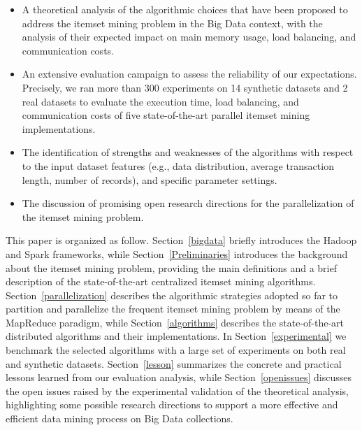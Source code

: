 \documentclass[preprint,review,12pt]{elsarticle}
\begin{document}
\begin{itemize}
\item A theoretical analysis of the algorithmic choices that have been proposed to address the itemset mining problem 
in the Big Data context, with the analysis of their expected impact on main memory usage, load balancing, and communication costs. 

\item An extensive evaluation campaign to assess the reliability of our expectations.
Precisely, we ran more than 300 experiments on 14 synthetic datasets and 2 real datasets to evaluate the execution time, load balancing, and communication costs
of five state-of-the-art parallel itemset mining implementations. 

\item The identification of strengths and weaknesses of the algorithms 
with respect to 
the input dataset features (e.g., data distribution, average  transaction length, number of records), 
and specific parameter settings. 

\item The discussion of promising open research directions for the parallelization of the itemset mining problem.

\end{itemize}

This paper is organized as follow. Section~\ref{bigdata} briefly introduces the
Hadoop and Spark frameworks,  while Section~\ref{Preliminaries} introduces the
background about the itemset mining problem, providing the main definitions and a brief description of the state-of-the-art centralized itemset mining algorithms. 
Section~\ref{parallelization} describes the algorithmic strategies adopted so far to partition and parallelize the frequent itemset mining problem by means of the MapReduce paradigm, while 
Section~\ref{algorithms} describes the state-of-the-art distributed algorithms and their implementations.
In Section~\ref{experimental} we benchmark the selected algorithms with a large set of experiments on both real and synthetic datasets.
Section~\ref{lesson} summarizes the concrete and practical lessons learned from our evaluation analysis, while Section~\ref{openissues} discusses the open issues raised by the experimental validation of the theoretical analysis, highlighting some possible research directions to support a more effective and efficient data mining process on Big Data collections. 
\end{document}
